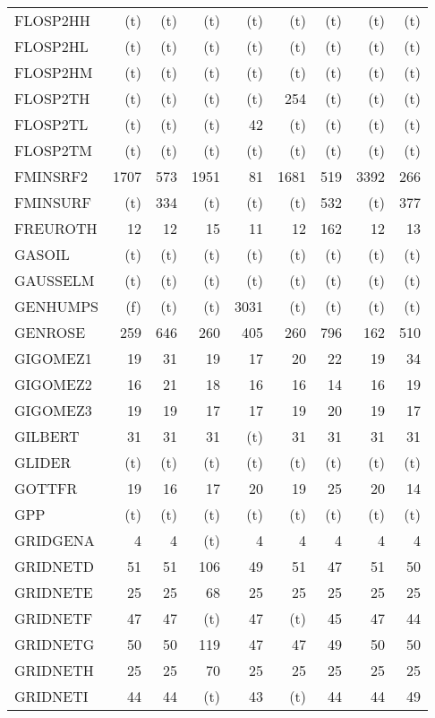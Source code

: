 \documentclass[11pt,twoside]{article}
\begin{document}
{\begin{longtable}[c]{|l|r|r|r|r|r|r|r|r|}
 FLOSP2HH & (t) & (t) & (t) & (t) & (t) & (t) & (t) & (t) \\
 FLOSP2HL & (t) & (t) & (t) & (t) & (t) & (t) & (t) & (t) \\
 FLOSP2HM & (t) & (t) & (t) & (t) & (t) & (t) & (t) & (t) \\
 FLOSP2TH & (t) & (t) & (t) & (t) & 254 & (t) & (t) & (t) \\
 FLOSP2TL & (t) & (t) & (t) & 42 & (t) & (t) & (t) & (t) \\
 FLOSP2TM & (t) & (t) & (t) & (t) & (t) & (t) & (t) & (t) \\
 FMINSRF2 & 1707 & 573 & 1951 & 81 & 1681 & 519 & 3392 & 266 \\
 FMINSURF & (t) & 334 & (t) & (t) & (t) & 532 & (t) & 377 \\
 FREUROTH & 12 & 12 & 15 & 11 & 12 & 162 & 12 & 13 \\
 GASOIL & (t) & (t) & (t) & (t) & (t) & (t) & (t) & (t) \\
 GAUSSELM & (t) & (t) & (t) & (t) & (t) & (t) & (t) & (t) \\
 GENHUMPS & (f) & (t) & (t) & 3031 & (t) & (t) & (t) & (t) \\
 GENROSE & 259 & 646 & 260 & 405 & 260 & 796 & 162 & 510 \\
 GIGOMEZ1 & 19 & 31 & 19 & 17 & 20 & 22 & 19 & 34 \\
 GIGOMEZ2 & 16 & 21 & 18 & 16 & 16 & 14 & 16 & 19 \\
 GIGOMEZ3 & 19 & 19 & 17 & 17 & 19 & 20 & 19 & 17 \\
 GILBERT & 31 & 31 & 31 & (t) & 31 & 31 & 31 & 31 \\
 GLIDER & (t) & (t) & (t) & (t) & (t) & (t) & (t) & (t) \\
 GOTTFR & 19 & 16 & 17 & 20 & 19 & 25 & 20 & 14 \\
 GPP & (t) & (t) & (t) & (t) & (t) & (t) & (t) & (t) \\
 GRIDGENA & 4 & 4 & (t) & 4 & 4 & 4 & 4 & 4 \\
 GRIDNETD & 51 & 51 & 106 & 49 & 51 & 47 & 51 & 50 \\
 GRIDNETE & 25 & 25 & 68 & 25 & 25 & 25 & 25 & 25 \\
 GRIDNETF & 47 & 47 & (t) & 47 & (t) & 45 & 47 & 44 \\
 GRIDNETG & 50 & 50 & 119 & 47 & 47 & 49 & 50 & 50 \\
 GRIDNETH & 25 & 25 & 70 & 25 & 25 & 25 & 25 & 25 \\
 GRIDNETI & 44 & 44 & (t) & 43 & (t) & 44 & 44 & 49 \\

\end{longtable}}
\end{document}
